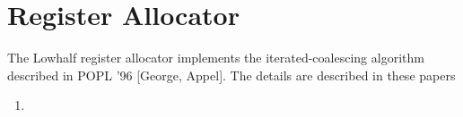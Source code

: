 \section{Register Allocator}

The Lowhalf register allocator implements the iterated-coalescing algorithm
described in POPL '96 [George, Appel].  The details are described in these
papers
\begin{enumerate}
\item {}
\end{enumerate}
